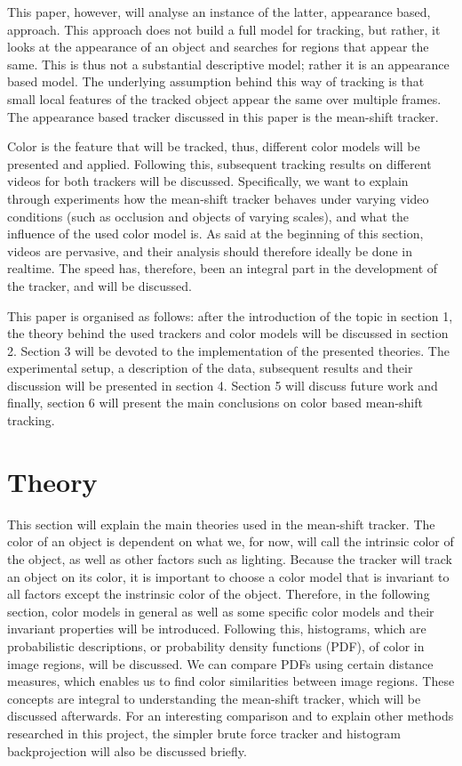 \documentclass[a4paper,11pt]{article}
\begin{document}
This paper, however, will analyse an instance of the latter, appearance based, approach. This approach does not build a full model for tracking, but rather, it looks at the appearance of an object and searches for regions that appear the same.  This is thus not a substantial descriptive model; rather it is an appearance based model. The underlying assumption behind this way of tracking is that small local features of the tracked object appear the same over multiple frames. The appearance based tracker discussed in this paper is the mean-shift tracker. 

Color is the feature that will be tracked, thus, different color models will be presented and applied. Following this, subsequent tracking results on different videos for both trackers will be discussed. Specifically, we want to explain through experiments how the mean-shift tracker behaves under varying video conditions (such as occlusion and objects of varying scales), and what the influence of the used color model is. As said at the beginning of this section, videos are pervasive, and their analysis should therefore ideally be done in realtime. The speed has, therefore, been an integral part in the development of the tracker, and will be discussed. 

This paper is organised as follows:  after the introduction of the topic in section 1, the theory behind the used trackers and color models will be discussed in section 2. Section 3 will be devoted to the implementation of the presented theories. The experimental setup, a description of the data, subsequent results and their discussion will be presented in section 4. Section 5 will discuss future work and finally, section 6 will present the main conclusions on color based mean-shift tracking.

\section{Theory}	

This section will explain the main theories used in the mean-shift tracker. The color of an object is dependent on what we, for now, will call the intrinsic color of the object, as well as other factors such as lighting. Because the tracker will track an object on its color, it is important to choose a color model that is invariant to all factors except the instrinsic color of the object. Therefore, in the following section, color models in general as well as some specific color models and their invariant properties will be introduced. Following this, histograms, which are probabilistic descriptions, or probability density functions (PDF), of color in image regions, will be discussed. We can compare PDFs using certain distance measures, which enables us to find color similarities between image regions. These concepts are integral to understanding the mean-shift tracker, which will be discussed afterwards. For an interesting comparison and to explain other methods researched in this project, the simpler brute force tracker and histogram backprojection will also be discussed briefly.  
\end{document}
